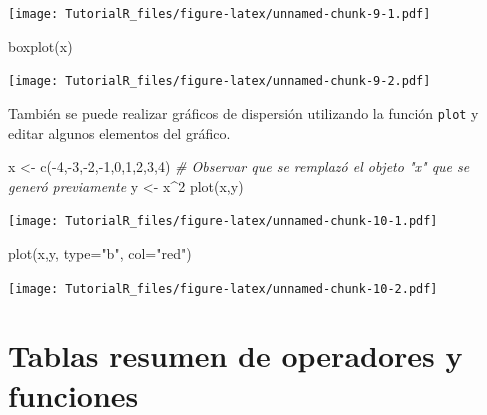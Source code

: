\documentclass[
]{book}
\newenvironment{Shaded}{\begin{snugshade}}{\end{snugshade}}
\newcommand{\AttributeTok}[1]{\textcolor[rgb]{0.77,0.63,0.00}{#1}}
\newcommand{\CommentTok}[1]{\textcolor[rgb]{0.56,0.35,0.01}{\textit{#1}}}
\newcommand{\DecValTok}[1]{\textcolor[rgb]{0.00,0.00,0.81}{#1}}
\newcommand{\FunctionTok}[1]{\textcolor[rgb]{0.00,0.00,0.00}{#1}}
\newcommand{\NormalTok}[1]{#1}
\newcommand{\OtherTok}[1]{\textcolor[rgb]{0.56,0.35,0.01}{#1}}
\newcommand{\SpecialCharTok}[1]{\textcolor[rgb]{0.00,0.00,0.00}{#1}}
\newcommand{\StringTok}[1]{\textcolor[rgb]{0.31,0.60,0.02}{#1}}
\begin{document}
\texttt{[image: TutorialR\_files/figure-latex/unnamed-chunk-9-1.pdf]}

\begin{Shaded}
\begin{Highlighting}[]
\FunctionTok{boxplot}\NormalTok{(x)}
\end{Highlighting}
\end{Shaded}

\texttt{[image: TutorialR\_files/figure-latex/unnamed-chunk-9-2.pdf]}

También se puede realizar gráficos de dispersión utilizando la función \texttt{plot} y editar algunos elementos del gráfico.

\begin{Shaded}
\begin{Highlighting}[]
\NormalTok{x }\OtherTok{\textless{}{-}} \FunctionTok{c}\NormalTok{(}\SpecialCharTok{{-}}\DecValTok{4}\NormalTok{,}\SpecialCharTok{{-}}\DecValTok{3}\NormalTok{,}\SpecialCharTok{{-}}\DecValTok{2}\NormalTok{,}\SpecialCharTok{{-}}\DecValTok{1}\NormalTok{,}\DecValTok{0}\NormalTok{,}\DecValTok{1}\NormalTok{,}\DecValTok{2}\NormalTok{,}\DecValTok{3}\NormalTok{,}\DecValTok{4}\NormalTok{)  }\CommentTok{\# Observar que se remplazó el objeto "x" que se generó previamente}
\NormalTok{y }\OtherTok{\textless{}{-}}\NormalTok{ x}\SpecialCharTok{\^{}}\DecValTok{2}
\FunctionTok{plot}\NormalTok{(x,y)}
\end{Highlighting}
\end{Shaded}

\texttt{[image: TutorialR\_files/figure-latex/unnamed-chunk-10-1.pdf]}

\begin{Shaded}
\begin{Highlighting}[]
\FunctionTok{plot}\NormalTok{(x,y, }\AttributeTok{type=}\StringTok{"b"}\NormalTok{, }\AttributeTok{col=}\StringTok{"red"}\NormalTok{)}
\end{Highlighting}
\end{Shaded}

\texttt{[image: TutorialR\_files/figure-latex/unnamed-chunk-10-2.pdf]}

\hypertarget{tablas_resumen}{%
\section{Tablas resumen de operadores y funciones}\label{tablas_resumen}}
\end{document}
